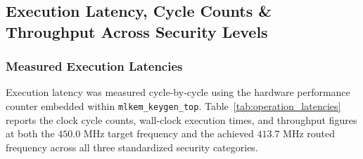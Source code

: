 \subsection{Execution Latency, Cycle Counts \& Throughput Across Security Levels}
\label{sec:results_latency}

\subsubsection{Measured Execution Latencies}
Execution latency was measured cycle-by-cycle using the hardware performance counter embedded within \texttt{mlkem\_keygen\_top}. Table~\ref{tab:operation_latencies} reports the clock cycle counts, wall-clock execution times, and throughput figures at both the $450.0\text{ MHz}$ target frequency and the achieved $413.7\text{ MHz}$ routed frequency across all three standardized security categories.

